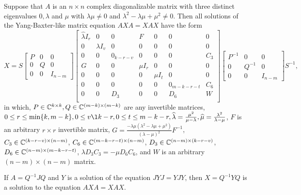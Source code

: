 \documentclass{article}
\begin{document}
\begin{theorem} \label{solutions}
  Suppose that $A$ is an $n \times n$ complex diagonalizable matrix with three distinct eigenvalues $0, \lambda$ and $\mu$ with $\lambda \mu \neq 0$ and $\lambda^2 - \lambda \mu + \mu^2 \neq 0$.
  Then all solutions of the Yang-Baxter-like matrix equation $A X A = X A X$ have the form
  \[X = S \begin{bmatrix} P & 0 & 0\\ 0 & Q & 0\\ 0 & 0 & I_{n - m} \end{bmatrix} \left[ \begin{array}{ccc|ccc|c} \widehat{\lambda} I_r & 0 & 0 & F & 0 & 0 & 0 \\ 0 & \lambda I_v & 0 & 0 & 0 & 0 & 0 \\ 0 & 0 & 0_{k - r - v} & 0 & 0 & 0 & C_3 \\ \hline G & 0 & 0 & \widehat{\mu} I_r & 0 & 0 & 0 \\ 0 & 0 & 0 & 0 & \mu I_t & 0 & 0 \\ 0 & 0 & 0 & 0 & 0 & 0_{m - k - r - t} & C_6 \\ \hline 0 & 0 & D_3 & 0 & 0 & D_6 & W \\ \end{array} \right] \begin{bmatrix} P^{-1} & 0 & 0\\ 0 & Q^{-1} & 0\\ 0 & 0 & I_{n - m} \end{bmatrix} S^{-1},\]
  in which, $P \in \mathbb{C}^{k \times k}, Q \in \mathbb{C}^{(m - k) \times (m - k)}$ are any invertible matrices, $0 \le r \le \min \{k, m - k\}, 0 \le v \l k - r, 0 \le t \le m - k - r, \widehat{\lambda} = \frac{\mu^2}{\mu - \lambda}, \widehat{\mu} = \frac{\lambda^2}{\lambda - \mu}$, $F$ is an arbitrary $r \times r$ invertible matrix, $G = \frac{- \lambda \mu (\lambda^2 - \lambda \mu + \mu^2)}{(\lambda - \mu)^2} F^{-1}$, $C_3 \in \mathbb{C}^{(k - r - v) \times (n - m)}$, $C_6 \in \mathbb{C}^{(m - k - r - t) \times (n - m)}$, $D_3 \in \mathbb{C}^{(n - m) \times (k - r - v)}$, $D_6 \in \mathbb{C}^{(n - m) \times (m - k - r - t)}$, $\lambda D_3 C_3 = - \mu D_6 C_6$, and $W$ is an arbitrary $(n - m) \times (n - m)$ matrix.
\end{theorem}

\begin{theorem} \label{similarity}
  If $A = Q^{-1} J Q$ and $Y$ is a solution of the equation $J Y J = Y J Y$, then $X = Q^{-1} Y Q$ is a solution to the equation $A X A = X A X$.
\end{theorem}
\end{document}

